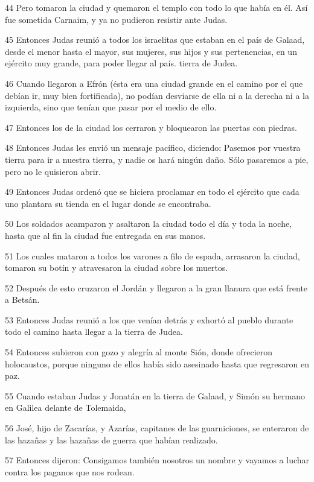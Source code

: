 \par 44 Pero tomaron la ciudad y quemaron el templo con todo lo que había en él. Así fue sometida Carnaim, y ya no pudieron resistir ante Judas.
\par 45 Entonces Judas reunió a todos los israelitas que estaban en el país de Galaad, desde el menor hasta el mayor, sus mujeres, sus hijos y sus pertenencias, en un ejército muy grande, para poder llegar al país. tierra de Judea.
\par 46 Cuando llegaron a Efrón (ésta era una ciudad grande en el camino por el que debían ir, muy bien fortificada), no podían desviarse de ella ni a la derecha ni a la izquierda, sino que tenían que pasar por el medio de ello.
\par 47 Entonces los de la ciudad los cerraron y bloquearon las puertas con piedras.
\par 48 Entonces Judas les envió un mensaje pacífico, diciendo: Pasemos por vuestra tierra para ir a nuestra tierra, y nadie os hará ningún daño. Sólo pasaremos a pie, pero no le quisieron abrir.
\par 49 Entonces Judas ordenó que se hiciera proclamar en todo el ejército que cada uno plantara su tienda en el lugar donde se encontraba.
\par 50 Los soldados acamparon y asaltaron la ciudad todo el día y toda la noche, hasta que al fin la ciudad fue entregada en sus manos.
\par 51 Los cuales mataron a todos los varones a filo de espada, arrasaron la ciudad, tomaron su botín y atravesaron la ciudad sobre los muertos.
\par 52 Después de esto cruzaron el Jordán y llegaron a la gran llanura que está frente a Betsán.
\par 53 Entonces Judas reunió a los que venían detrás y exhortó al pueblo durante todo el camino hasta llegar a la tierra de Judea.
\par 54 Entonces subieron con gozo y alegría al monte Sión, donde ofrecieron holocaustos, porque ninguno de ellos había sido asesinado hasta que regresaron en paz.
\par 55 Cuando estaban Judas y Jonatán en la tierra de Galaad, y Simón su hermano en Galilea delante de Tolemaida,
\par 56 José, hijo de Zacarías, y Azarías, capitanes de las guarniciones, se enteraron de las hazañas y las hazañas de guerra que habían realizado.
\par 57 Entonces dijeron: Consigamos también nosotros un nombre y vayamos a luchar contra los paganos que nos rodean.
